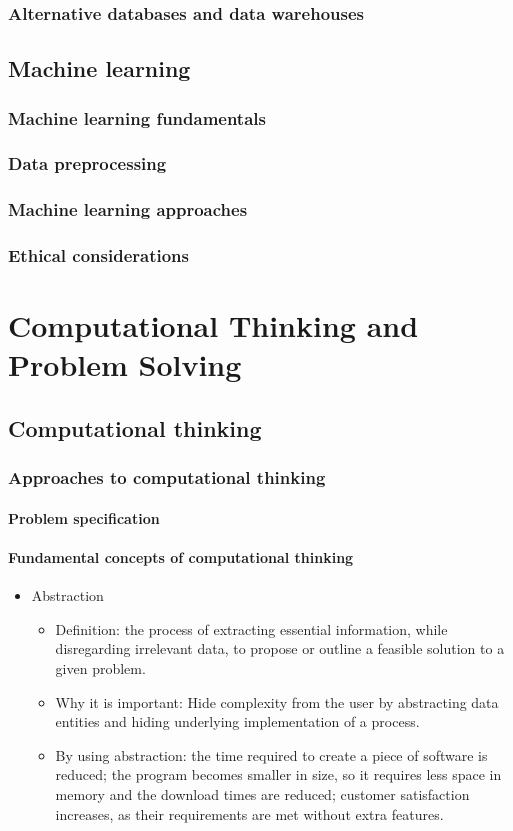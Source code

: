 \subsubsection{Alternative databases and data warehouses}
\subsection{Machine learning}
\subsubsection{Machine learning fundamentals}
\subsubsection{Data preprocessing}
\subsubsection{Machine learning approaches}
\subsubsection{Ethical considerations}

\newpage
\section{Computational Thinking and Problem Solving}
\subsection{Computational thinking}
\subsubsection{Approaches to computational thinking}
\paragraph{Problem specification}
\paragraph{Fundamental concepts of computational thinking}
\begin{itemize}
    \item Abstraction
    \begin{itemize}
        \item Definition: the process of extracting essential information, while disregarding irrelevant data, to propose or outline a feasible solution to a given problem.
        \item Why it is important: Hide complexity from the user by abstracting data entities and hiding underlying implementation of a process.
        \item By using abstraction: the time required to create a piece of software is reduced; the program becomes smaller in size, so it requires less space in memory and the download times are reduced; customer satisfaction increases, as their requirements are met without extra features. 
    \end{itemize}
\end{itemize}


